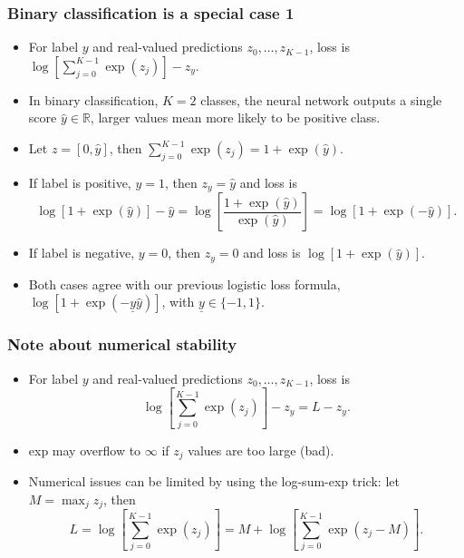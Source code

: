 \message{ !name(06-backprop.tex)}\documentclass{beamer}
\begin{document}
\begin{frame}
  \frametitle{Binary classification is a special case 1}
  \begin{itemize}
  \item For label $y$ and real-valued predictions $z_0,\dots,z_{K-1}$, loss is
$
\log
\left[
\sum_{j=0}^{K-1}  \exp(z_j) 
\right]
-z_y.
$
\item In binary classification, $K=2$ classes, the neural network
  outputs a single score $\hat y\in\mathbb R$, larger values mean more
  likely to be positive class.
\item Let $z=[0,\hat y]$, then $\sum_{j=0}^{K-1} \exp(z_j) = 1+\exp(\hat y)$.
\item If label is positive, $y=1$, then $z_y=\hat y$ and loss is 
$$
\log
\left[
1+\exp(\hat y)
\right]
-\hat y
=
\log\left[
\frac{1+\exp(\hat y)}{\exp(\hat y)}
\right]
=
\log[1+\exp(-\hat y)].
$$
\item If label is negative, $y=0$, then $z_y=0$ and loss is
$
\log
\left[
1+\exp(\hat y)
\right].
$
\item Both cases agree with our previous logistic loss formula,
  $\log[1+\exp(-\underline y \hat y)]$, with $\underline y\in\{-1,1\}$.
\end{itemize}
\end{frame}

\begin{frame}
  \frametitle{Note about numerical stability}
  \begin{itemize}
  \item For label $y$ and real-valued predictions $z_0,\dots,z_{K-1}$, loss is
$$
\log
\left[
\sum_{j=0}^{K-1}  \exp(z_j) 
\right]
-z_y= L-z_y.
$$
\item exp may overflow to $\infty$ if $z_j$ values are too large (bad).
\item Numerical issues can be limited by using the log-sum-exp trick:
  let $M=\max_j z_j$, then
$$
L = \log
\left[
\sum_{j=0}^{K-1}  \exp(z_j) 
\right]
= 
M+\log
\left[
\sum_{j=0}^{K-1}  \exp(z_j-M) 
\right].
$$
  \end{itemize}
\end{frame}
\end{document}
